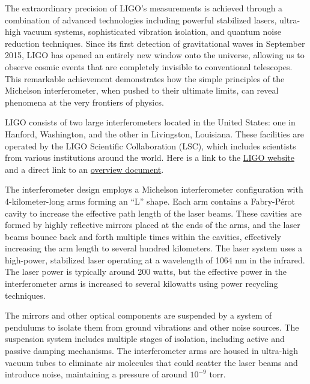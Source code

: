 \documentclass[
  a4paper,
]{book}
\begin{document}
The extraordinary precision of LIGO's measurements is achieved through a
combination of advanced technologies including powerful stabilized
lasers, ultra-high vacuum systems, sophisticated vibration isolation,
and quantum noise reduction techniques. Since its first detection of
gravitational waves in September 2015, LIGO has opened an entirely new
window onto the universe, allowing us to observe cosmic events that are
completely invisible to conventional telescopes. This remarkable
achievement demonstrates how the simple principles of the Michelson
interferometer, when pushed to their ultimate limits, can reveal
phenomena at the very frontiers of physics.

\begin{tcolorbox}[enhanced jigsaw, breakable, toptitle=1mm, bottomrule=.15mm, colbacktitle=quarto-callout-note-color!10!white, title=\textcolor{quarto-callout-note-color}{\faInfo}\hspace{0.5em}{LIGO Technical Details}, arc=.35mm, rightrule=.15mm, bottomtitle=1mm, opacityback=0, toprule=.15mm, coltitle=black, leftrule=.75mm, opacitybacktitle=0.6, colback=white, left=2mm, titlerule=0mm, colframe=quarto-callout-note-color-frame]

LIGO consists of two large interferometers located in the United States:
one in Hanford, Washington, and the other in Livingston, Louisiana.
These facilities are operated by the LIGO Scientific Collaboration
(LSC), which includes scientists from various institutions around the
world. Here is a link to the \href{https://www.ligo.caltech.edu/}{LIGO
website} and a direct link to an
\href{https://www.ligo.caltech.edu/system/media_files/binaries/303/original/ligo-educators-guide.pdf?1455165573}{overview
document}.

The interferometer design employs a Michelson interferometer
configuration with 4-kilometer-long arms forming an ``L'' shape. Each
arm contains a Fabry-Pérot cavity to increase the effective path length
of the laser beams. These cavities are formed by highly reflective
mirrors placed at the ends of the arms, and the laser beams bounce back
and forth multiple times within the cavities, effectively increasing the
arm length to several hundred kilometers. The laser system uses a
high-power, stabilized laser operating at a wavelength of 1064 nm in the
infrared. The laser power is typically around 200 watts, but the
effective power in the interferometer arms is increased to several
kilowatts using power recycling techniques.

The mirrors and other optical components are suspended by a system of
pendulums to isolate them from ground vibrations and other noise
sources. The suspension system includes multiple stages of isolation,
including active and passive damping mechanisms. The interferometer arms
are housed in ultra-high vacuum tubes to eliminate air molecules that
could scatter the laser beams and introduce noise, maintaining a
pressure of around \(10^{-9}\) torr.


\end{tcolorbox}
\end{document}
